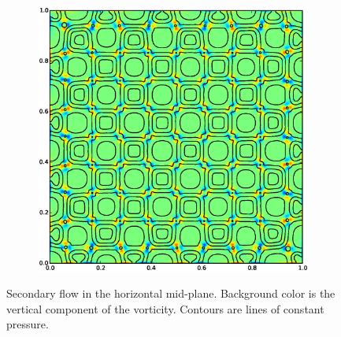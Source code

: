 \begin{figure}
\begin{subfigure}[b]{0.32\textwidth}
\end{subfigure}
\begin{subfigure}[b]{0.32\textwidth}
  \includegraphics[width=\textwidth]{figs/vorticity-45-10}
\end{subfigure}
\caption{ 
Secondary flow in the horizontal mid-plane.
Background color is the vertical component of the vorticity.
Contours are lines of constant pressure.
}
\end{figure}

